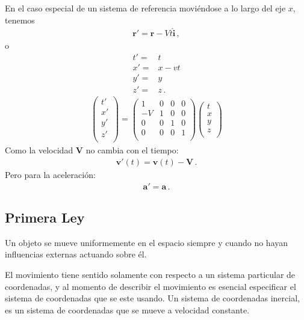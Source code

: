 En el caso especial de un sistema de referencia movi\'endose a lo largo del eje $x$, tenemos
\begin{align}
  \mathbf{r}'=\mathbf{r}-V t\hat{\mathbf{i}}\,,
\end{align}
o
\begin{align}
  t'=&t\nonumber\\
  x'=&x-vt\nonumber\\
  y'=&y\nonumber\\
  z'=&z\,.
\end{align}
\begin{align}
  \begin{pmatrix}
    t'\\
    x'\\
    y'\\
    z'\\
  \end{pmatrix}=
  \begin{pmatrix}
    1&0&0&0\\
    -V&1&0&0\\
    0&0&1&0\\
    0&0&0&1\\
  \end{pmatrix}
  \begin{pmatrix}
    t\\
    x\\
    y\\
    z\\
  \end{pmatrix}
\end{align}
Como la velocidad $\mathbf{V}$ no cambia con el tiempo:
\begin{align}
  \mathbf{v}'(t)=\mathbf{v}(t)-\mathbf{V}\,.
\end{align}
Pero para la aceleraci\'on:
\begin{align}
  \mathbf{a}'=\mathbf{a}\,.
\end{align}


\subsection{Primera Ley}

Un objeto se mueve uniformemente en el espacio siempre y cuando no hayan influencias externas actuando sobre \'el.

El movimiento tiene sentido solamente con respecto a un sistema particular de coordenadas, y al momento de describir el movimiento es esencial especificar el sistema de coordenadas que se este usando. Un sistema de coordenadas inercial, es un sistema de coordenadas que se mueve a velocidad constante.


